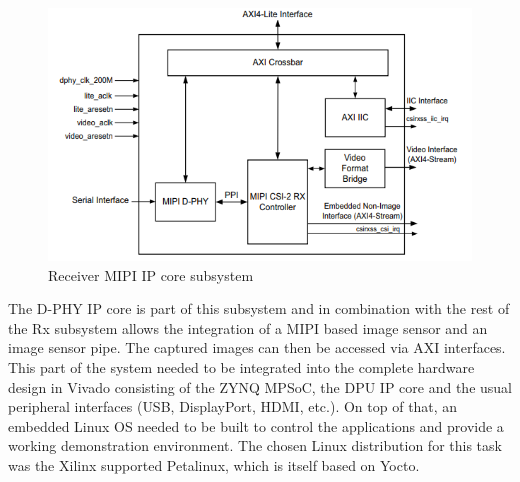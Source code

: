 \begin{figure}[!htb]
	\centering
		\includegraphics[width=\textwidth]{bilder/MIPI_rx.png}
		\caption{Receiver \acs{MIPI} \acs{IP} core subsystem~\cite{mipi-rx}}
		\label{fig:mipi_dphy}
\end{figure}
The D-PHY \ac{IP} core is part of this subsystem and in combination with the rest of the Rx subsystem allows the integration of a \ac{MIPI} based image sensor and an image sensor pipe. The captured images can then be accessed via \ac{AXI} interfaces. This part of the system needed to be integrated into the complete hardware design in Vivado consisting of the ZYNQ \ac{MPSoC}, the \ac{DPU} \ac{IP} core and the usual peripheral interfaces (\ac{USB}, DisplayPort, HDMI, etc.). On top of that, an embedded Linux \ac{OS} needed to be built to control the applications and provide a working demonstration environment. The chosen Linux distribution for this task was the Xilinx supported Petalinux, which is itself based on Yocto.